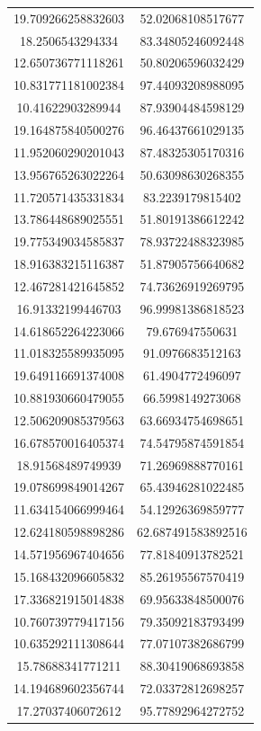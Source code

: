 \begin{table}
\begin{tabular}{cc}
19.709266258832603 & 52.02068108517677 \\
18.2506543294334 & 83.34805246092448 \\
12.650736771118261 & 50.80206596032429 \\
10.831771181002384 & 97.44093208988095 \\
10.41622903289944 & 87.93904484598129 \\
19.164875840500276 & 96.46437661029135 \\
11.952060290201043 & 87.48325305170316 \\
13.956765263022264 & 50.63098630268355 \\
11.720571435331834 & 83.2239179815402 \\
13.786448689025551 & 51.80191386612242 \\
19.775349034585837 & 78.93722488323985 \\
18.916383215116387 & 51.87905756640682 \\
12.467281421645852 & 74.73626919269795 \\
16.91332199446703 & 96.99981386818523 \\
14.618652264223066 & 79.676947550631 \\
11.018325589935095 & 91.0976683512163 \\
19.649116691374008 & 61.4904772496097 \\
10.881930660479055 & 66.5998149273068 \\
12.506209085379563 & 63.66934754698651 \\
16.678570016405374 & 74.54795874591854 \\
18.91568489749939 & 71.26969888770161 \\
19.078699849014267 & 65.43946281022485 \\
11.634154066999464 & 54.12926369859777 \\
12.624180598898286 & 62.687491583892516 \\
14.571956967404656 & 77.81840913782521 \\
15.168432096605832 & 85.26195567570419 \\
17.336821915014838 & 69.95633848500076 \\
10.760739779417156 & 79.35092183793499 \\
10.635292111308644 & 77.07107382686799 \\
15.78688341771211 & 88.30419068693858 \\
14.194689602356744 & 72.03372812698257 \\
17.27037406072612 & 95.77892964272752 \\

\end{tabular}
\end{table}
